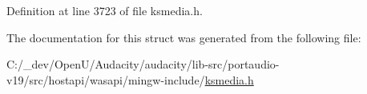 Definition at line 3723 of file ksmedia.\+h.



The documentation for this struct was generated from the following file\+:\begin{DoxyCompactItemize}
\item 
C\+:/\+\_\+dev/\+Open\+U/\+Audacity/audacity/lib-\/src/portaudio-\/v19/src/hostapi/wasapi/mingw-\/include/\hyperlink{ksmedia_8h}{ksmedia.\+h}\end{DoxyCompactItemize}
